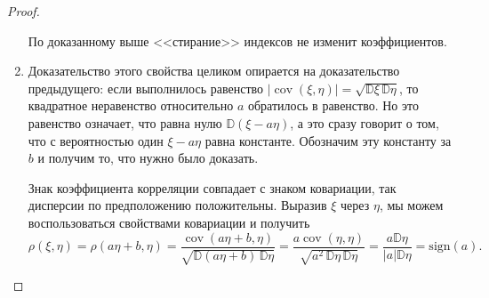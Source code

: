 \begin{proof}
\begin{enumerate}
        По доказанному выше <<стирание>> индексов не изменит коэффициентов.

    \item 
        Доказательство этого свойства целиком опирается на доказательство предыдущего: если выполнилось равенство $|\operatorname{cov}(\xi, \eta)|=\sqrt{\mathbb{D} \xi \, \mathbb{D} \eta}$, 
        то квадратное неравенство относительно $a$ обратилось в равенство.
        Но это равенство означает, что равна нулю $\mathbb{D}(\xi - a \eta)$, а это сразу говорит о том, что с вероятностью один $\xi - a\eta$ равна константе.
        Обозначим эту константу за $b$ и получим то, что нужно было доказать.
        
        Знак коэффициента корреляции совпадает с знаком ковариации, так дисперсии по предположению положительны. Выразив $\xi$ через $\eta$, мы можем воспользоваться свойствами ковариации и получить
        $$ \rho(\xi, \eta) = \rho(a\eta + b, \eta)=
        \frac{\operatorname{cov}(a\eta + b, \eta)}
        {\sqrt{\mathbb{D}(a\eta + b) \, \mathbb{D}\eta}} = 
        \frac{a\operatorname{cov}(\eta, \eta)}
        {\sqrt{a^2\, \mathbb{D}\eta \, \mathbb{D}\eta}} = 
        \frac{a\mathbb{D}\eta}
        {|a|\mathbb{D}\eta} = 
        \text{sign}(a).
        $$

\end{enumerate}
\end{proof}
